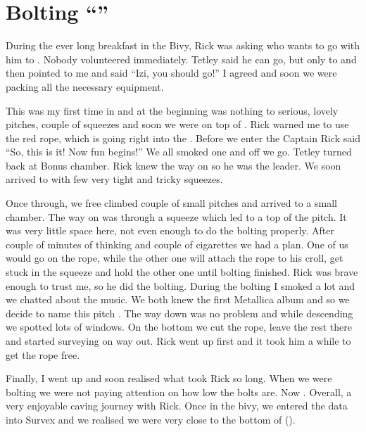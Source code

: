 \section{Bolting ``''}


During the ever long breakfast in the Bivy, Rick was asking who wants to
go with him to . Nobody volunteered immediately. Tetley
said he can go, but only to  and then pointed to me and
said ``Izi, you should go!'' I agreed and soon we were packing all the
necessary equipment.

This was my first time in  and at the beginning was nothing to
serious, lovely pitches, couple of squeezes and soon we were on top of
. Rick warned me to use the red rope, which is going right into the
. Before we enter the Captain Rick said ``So, this is
it! Now fun begins!'' We all smoked one and off we go. Tetley turned
back at Bonus chamber. Rick knew the way on so he was the leader. We
soon arrived to  with few very tight and tricky squeezes.

Once through, we free climbed couple of small pitches and arrived to a
small chamber. The way on was through a squeeze which led to a top of
the pitch. It was very little space here, not even enough to do the
bolting properly. After couple of minutes of thinking and couple of
cigarettes we had a plan. One of us would go on the rope, while the
other one will attach the rope to his croll, get stuck in the squeeze
and hold the other one until bolting finished. Rick was brave enough to
trust me, so he did the bolting. During the bolting I smoked a lot and
we chatted about the music. We both knew the first Metallica album and
so we decide to name this pitch . The way down was no
problem and while descending we spotted lots of windows. On the bottom
we cut the rope, leave the rest there and started surveying on way out.
Rick went up first and it took him a while to get the rope free. 

Finally, I went up and soon realised what took Rick so long. When we were bolting
we were not paying attention on how low the bolts are. Now . Overall, a very
enjoyable caving journey with Rick. Once in the bivy, we entered the
data into Survex and we realised we were very close to the bottom of
 ().


